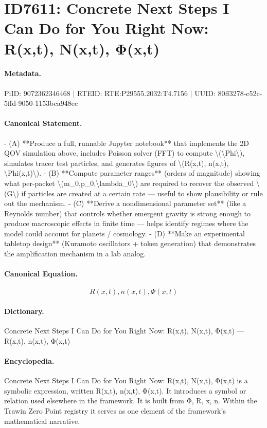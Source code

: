 \section*{ID7611: Concrete Next Steps I Can Do for You Right Now: R(x,t), N(x,t), Φ(x,t)}
\paragraph{Metadata.}
PiID: 9072362346468 | RTEID: RTE:P29555.2032:T4.7156 | UUID: 80ff3278-c52c-5ffd-9050-1153bca948ec

\paragraph{Canonical Statement.}
- (A) **Produce a full, runnable Jupyter notebook** that implements the 2D QOV simulation above, includes Poisson solver (FFT) to compute \textbackslash{}(\textbackslash{}Phi\textbackslash{}), simulates tracer test particles, and generates figures of \textbackslash{}(R(x,t), n(x,t), \textbackslash{}Phi(x,t)\textbackslash{}). - (B) **Compute parameter ranges** (orders of magnitude) showing what per-packet \textbackslash{}(m\_0,p\_0,\textbackslash{}lambda\_0\textbackslash{}) are required to recover the observed \textbackslash{}(G\textbackslash{}) if particles are created at a certain rate — useful to show plausibility or rule out the mechanism. - (C) **Derive a nondimensional parameter set** (like a Reynolds number) that controls whether emergent gravity is strong enough to produce macroscopic effects in finite time — helps identify regimes where the model could account for planets / cosmology. - (D) **Make an experimental tabletop design** (Kuramoto oscillators + token generation) that demonstrates the amplification mechanism in a lab analog.

\paragraph{Canonical Equation.}
\[
R(x,t), n(x,t), \Phi(x,t)
\]

\paragraph{Dictionary.}
Concrete Next Steps I Can Do for You Right Now: R(x,t), N(x,t), Φ(x,t) — R(x,t), n(x,t), Φ(x,t)

\paragraph{Encyclopedia.}
Concrete Next Steps I Can Do for You Right Now: R(x,t), N(x,t), Φ(x,t) is a symbolic expression, written R(x,t), n(x,t), Φ(x,t). It introduces a symbol or relation used elsewhere in the framework. It is built from Φ, R, x, n. Within the Trawin Zero Point registry it serves as one element of the framework's mathematical narrative.
